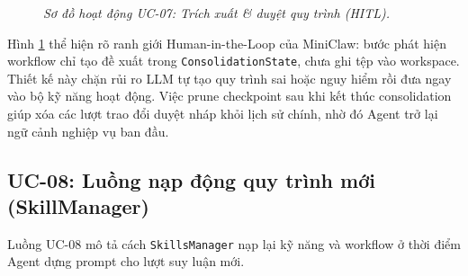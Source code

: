 \begin{figure}[p]
{
  }
  \caption{\emph{Sơ đồ hoạt động UC-07: Trích xuất \& duyệt quy trình (HITL).}}
  \label{fig:activity-uc07}
\end{figure}
\clearpage

Hình \ref{fig:activity-uc07} thể hiện rõ ranh giới Human-in-the-Loop của MiniClaw: bước phát hiện workflow chỉ tạo đề xuất trong \texttt{ConsolidationState}, chưa ghi tệp vào workspace. Thiết kế này chặn rủi ro LLM tự tạo quy trình sai hoặc nguy hiểm rồi đưa ngay vào bộ kỹ năng hoạt động. Việc prune checkpoint sau khi kết thúc consolidation giúp xóa các lượt trao đổi duyệt nháp khỏi lịch sử chính, nhờ đó Agent trở lại ngữ cảnh nghiệp vụ ban đầu.

\subsection{UC-08: Luồng nạp động quy trình mới (SkillManager)}
Luồng UC-08 mô tả cách \texttt{SkillsManager} nạp lại kỹ năng và workflow ở thời điểm Agent dựng prompt cho lượt suy luận mới.

